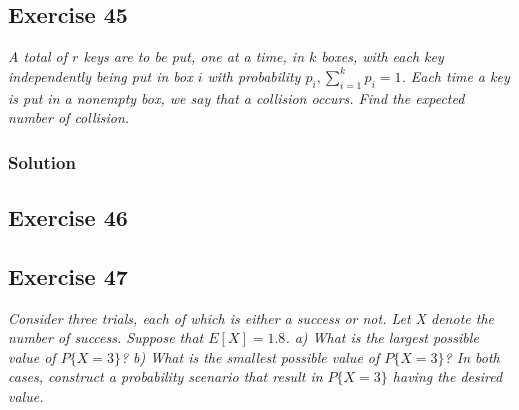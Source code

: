 \documentclass[12pt,a4paper]{article}
\begin{document}
\subsection{Exercise 45}

\textit{A total of $r$ keys are to be put, one at a time, in $k$ boxes, with each key independently being put in box $i$ with probability $p_i, \sum_{i=1}^k p_i = 1$. Each time a key is put in a nonempty box, we say that a collision occurs. Find the expected number of collision.}


\subsubsection{Solution}


\subsection{Exercise 46}

\subsection{Exercise 47}

\textit{Consider three trials, each of which is either a success or not. Let X denote the number of success. Suppose that $E[X] = 1.8$. a) What is the largest possible value of $P\{X=3\}$? b) What is the smallest possible value of $P\{X=3\}$? In both cases, construct a probability scenario that result in $P\{X=3\}$ having the desired value.}
\end{document}
